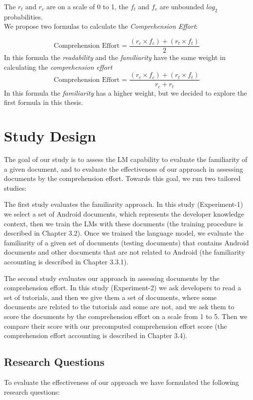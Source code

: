 \documentclass[12pt,mscthesis]{usiinfthesis}
\begin{document}
 The $r_{t}$  and $r_{c}$ are on a scale of 0 to 1,  the $f_{t}$  and $f_{c}$ are unbounded $log_{2}$ probabilities.\\
 We propose two formulas to calculate the \emph{Comprehension Effort}:

 \[\text{Comprehension Effort = }\frac{(r_{c}\times f_{c}) + (r_{t} \times f_{t})}{2} \]
 In this formula the \emph{readability} and the \emph{familiarity} have the same weight in calculating the \emph{comprehension effort}
 \[\text{Comprehension Effort = }\frac{(r_{c}\times f_{c}) + (r_{t} \times f_{t})}{r_c+r_t} \]
 In this formula the \emph{familiarity} has a higher weight, but we decided to explore the first formula in this thesis.
	
\chapter{Study Design}

	The goal of our study is to assess the LM capability to evaluate the familiarity of a given document, and to evaluate the effectiveness of our approach in assessing documents by the comprehension effort. Towards this goal, we run two tailored studies:
	

	The first study evaluates the familiarity approach. In this study (Experiment-1) we select a set of Android documents, which represents the developer knowledge context, then we train the LMs with these documents (the training procedure is described in Chapter 3.2). Once we trained the language model, we evaluate the familiarity of a given set of documents (testing documents) that contains Android documents and other documents that are not related to Android (the familiarity accounting is described in Chapter 3.3.1). 
		

	 The second study evaluates our approach in assessing documents by the comprehension effort. In this study (Experiment-2) we ask developers to read a set of tutorials, and then we give them a set of documents, where some documents are related to the tutorials and some are not, and we ask them to score the documents by the comprehension effort on a scale from 1 to 5. Then we compare their score with our precomputed comprehension effort score (the comprehension effort accounting is described in Chapter 3.4).


	\section{Research Questions}
	To evaluate the effectiveness of our approach we have formulated the following research questions:
	\newpage
\end{document}
